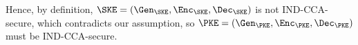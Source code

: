 \begin{answer}
    Hence, by definition, $\SKE= (\Gen_\SKE, \Enc_\SKE, \Dec_\SKE)$ is not IND-CCA-secure, which contradicts our assumption, so $\PKE=(\Gen_\PKE, \Enc_\PKE, \Dec_\PKE)$ must be IND-CCA-secure.
\end{answer}
